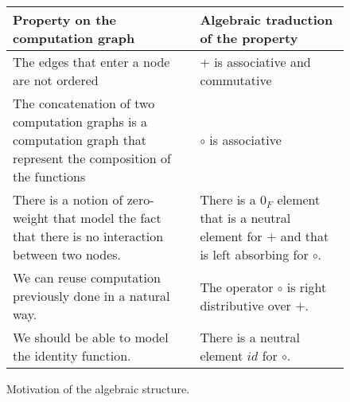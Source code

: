 \documentclass[11pt,a4paper]{article}
\begin{document}
	\begin{figure}
		\centering
		\begin{tabular}{|C{7.5cm}|C{7.5cm}|}
			\hline 
			\textbf{Property on the computation graph} & \textbf{Algebraic traduction of the property} \\ 
			\hline 
			The edges that enter a node are not ordered & + is associative and commutative \\ 
			\hline
			The concatenation of two computation graphs is a computation graph that represent the composition of the functions & $\circ$ is associative \\ 
			\hline 
			There is a notion of zero-weight that model the fact that there is no interaction between two nodes. & There is a $0_F$ element that is a neutral element for $+$ and that is left absorbing for $\circ$. \\ 
			\hline 
			We can reuse computation previously done in a natural way. & The operator $\circ$ is right distributive over $+$. \\ 
			\hline 
			We should be able to model the identity function. & There is a neutral element $id$ for $\circ$. \\ 
			\hline 
		\end{tabular} 
	\caption{Motivation of the algebraic structure.}
	\label{fig:table_algebraic_structure}
	\end{figure}
\end{document}
